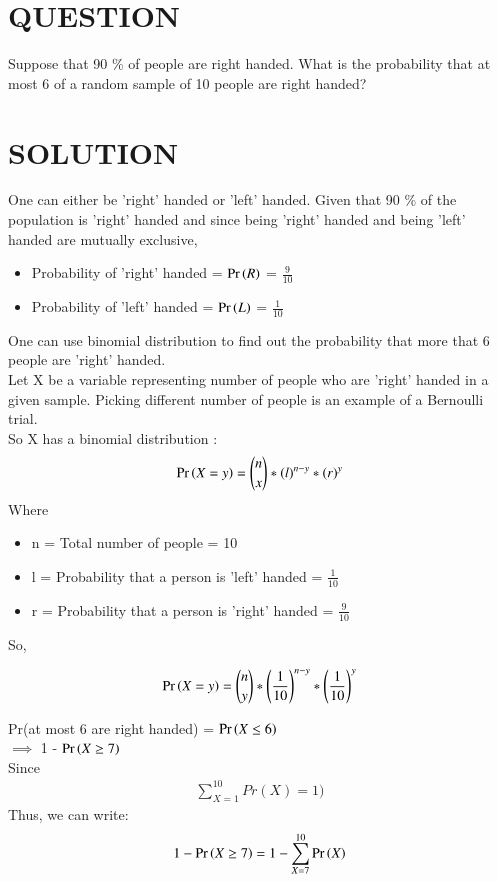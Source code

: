 \documentclass[journal,12pt,twocolumn]{IEEEtran}
\begin{document}
\section*{QUESTION}
Suppose that 90 \% of people are right handed. 
What is the probability that at most 6 of a random sample 
of 10 people are right handed?\\
\section*{SOLUTION}
One can either be 'right' handed or 'left' handed. Given that 90 \% of the population is 'right' handed and since being 'right' handed and being 'left' handed are mutually exclusive,
\bigskip
\begin{itemize}
\item Probability of 'right' handed = $\Pr\left(R\right)$ = \(\frac{9}{10}\)
\item Probability of 'left' handed = $\Pr\left(L\right)$ = \( \frac{1}{10} \)
\end{itemize}
\bigskip
One can use binomial distribution to find out the probability that more that 6 people are 'right' handed.\\
Let X be a variable representing number of people who are 'right' handed in a given sample. Picking different number of people is an example of a Bernoulli trial.\\
So X has a binomial distribution : 
\begin{align}
\Pr\left(X=y\right) = {{n}\choose{x}} * (l)^{n-y} * (r)^{y}\label{0.0.1}
\end{align}
Where
\begin{itemize}
    \item n = Total number of people = 10 
    \item l = Probability that a person is 'left' handed = \( \frac{1}{10} \)
    \item r = Probability that a person is 'right' handed = \( \frac{9}{10} \)
\end{itemize}
\bigskip
So,

\begin{align}
\Pr\left(X=y\right) = {{n}\choose{y}} * \left(\frac{1}{10}\right)^{n-y} * \left(\frac{1}{10}\right)^{y}
\end{align}

Pr(at most 6 are right handed) = $\Pr\left(X \leq 6\right)$ \\
$\implies$ 1 - $\Pr\left(X \geq 7\right)$\\
Since\\
\bigskip
\begin{align}
\sum_{X=1}^{10} Pr(X) = 1)\label{0.0.3}
\end{align}
\bigskip
Thus, we can write:
\begin{align}
1 - \Pr\left(X \geq 7\right) = 1 - \sum_{X=7}^{10} \Pr\left(X\right)\label{0.0.4}
\end{align}
\end{document}
